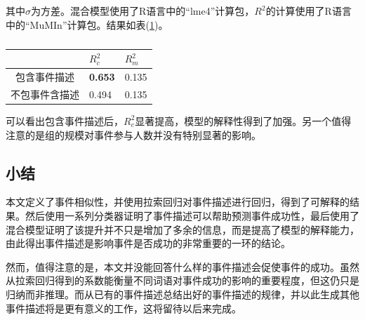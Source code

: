 其中\(\sigma\)为方差。混合模型使用了R语言中的``lme4''计算包\cite{lme4}，\(R^2\)的计算使用了R语言
中的``MuMIn''计算包\cite{MuMIn}。结果如表(\ref{t3})。

\begin{table}[htbp]
	\centering
  \caption{}
  \label{t3}
	\begin{tabular}{cll}
		\hline
                           &  \(R_c^2\) & \(R_m^2\) \\ 
    \hline
		包含事件描述                       & \textbf{0.653} & 0.135 \\ 
    不包事件含描述                        & 0.494 & 0.135 \\ 
    \hline
	\end{tabular}
\end{table}

可以看出包含事件描述后，\(R_c^2\)显著提高，模型的解释性得到了加强。另一个值得注意的是组的规模对事件参与人数并没有特别显著的影响。

\subsection{小结}
本文定义了事件相似性，并使用拉索回归对事件描述进行回归，得到了可解释的结果。然后使用一系列分类器证明了事件描述可以帮助预测事件成功性，最后使用了混合模型证明了该提升并不只是增加了多余的信息，而是提高了模型的解释能力，由此得出事件描述是影响事件是否成功的非常重要的一环的结论。

然而，值得注意的是，本文并没能回答什么样的事件描述会促使事件的成功。虽然从拉索回归得到的系数能衡量不同词语对事件成功的影响的重要程度，但这仍只是归纳而非推理。而从已有的事件描述总结出好的事件描述的规律，并以此生成其他事件描述将是更有意义的工作，这将留待以后来完成。

% 